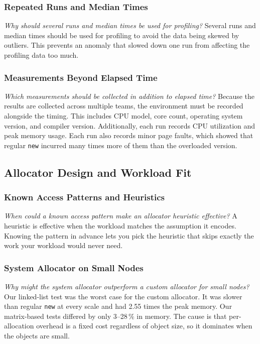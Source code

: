 \subsubsection{Repeated Runs and Median Times}
\emph{Why should several runs and median times be used for profiling?}
Several runs and median times should be used for profiling to avoid the data
being skewed by outliers.
This prevents an anomaly that slowed down one run from affecting the profiling
data too much.

\subsubsection{Measurements Beyond Elapsed Time}
\emph{Which measurements should be collected in addition to elapsed time?}
Because the results are collected across multiple teams, the environment must
be recorded alongside the timing.
This includes CPU model, core count, operating system version, and compiler
version.
Additionally, each run records CPU utilization and peak memory usage.
Each run also records minor page faults, which showed that regular
\texttt{new} incurred many times more of them than the overloaded version.

\subsection{Allocator Design and Workload Fit}
\label{sec:rq-policy}

\subsubsection{Known Access Patterns and Heuristics}
\emph{When could a known access pattern make an allocator heuristic
effective?}
A heuristic is effective when the workload matches the assumption it encodes.
Knowing the pattern in advance lets you pick the heuristic that skips exactly
the work your workload would never need.

\subsubsection{System Allocator on Small Nodes}
\emph{Why might the system allocator outperform a custom allocator for small
nodes?}
Our linked-list test was the worst case for the custom allocator.
It was slower than regular \texttt{new} at every scale and had 2.55 times the
peak memory.
Our matrix-based tests differed by only 3--28\,\% in memory.
The cause is that per-allocation overhead is a fixed cost regardless of object
size, so it dominates when the objects are small.

